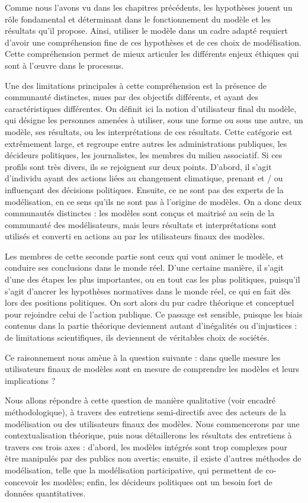 Comme nous l'avons vu dans les chapitres précédents, les hypothèses jouent un rôle fondamental et déterminant dans le fonctionnement du modèle et les résultats qu'il propose. Ainsi, utiliser le modèle dans un cadre adapté requiert d'avoir une compréhension fine de ces hypothèses et de ces choix de modélisation. Cette compréhension permet de mieux articuler les différents enjeux éthiques qui sont à l'œuvre dans le processus. 

Une des limitations principales à cette compréhension est la présence de communauté distinctes, mues par des objectifs différents, et ayant des caractéristiques différentes. On définit ici la notion d'utilisateur final du modèle, qui désigne les personnes amenées à utiliser, sous une forme ou sous une autre, un modèle, ses résultats, ou les interprétations de ces résultats. Cette catégorie est extrêmement large, et regroupe entre autres les administrations publiques, les décideurs politiques, les journalistes, les membres du milieu associatif. Si ces profils sont très divers, ils se rejoignent sur deux points. D'abord, il s'agit d'individu ayant des actions liées au changement climatique, prenant et / ou influençant des décisions politiques. Ensuite, ce ne sont pas des experts de la modélisation, en ce sens qu'ils ne sont pas à l'origine de modèles. On a donc deux communautés distinctes : les modèles sont conçus et maitrisé au sein de la communauté des modélisateurs, mais leurs résultats et interprétations sont utilisés et converti en actions au par les utilisateurs finaux des modèles. 

Les membres de cette seconde partie sont ceux qui vont animer le modèle, et conduire ses conclusions dans le monde réel. D'une certaine manière, il s'agit d'une des étapes les plus importantes, ou en tout cas les plus politiques, puisqu'il s'agit d'ancrer les hypothèses normatives dans le monde réel, ce qui en fait dès lors des positions politiques. On sort alors du pur cadre théorique et conceptuel pour rejoindre celui de l'action publique. Ce passage est sensible, puisque les biais contenus dans la partie théorique deviennent autant d'inégalités ou d'injustices : de limitations scientifiques, ils deviennent de véritables choix de sociétés.

Ce raisonnement nous amène à la question suivante : dans quelle mesure les utilisateurs finaux de modèles sont en mesure de comprendre les modèles et leurs implications ? 

Nous allons répondre à cette question de manière qualitative (voir encadré méthodologique), à travers des entretiens semi-directifs avec des acteurs de la modélisation ou des utilisateurs finaux des modèles. Nous commencerons par une contextualisation théorique, puis nous détaillerons les résultats des entretiens à travers ces trois axes : d'abord, les modèles intégrés sont trop complexes pour être manipulés par des publics non avertis; ensuite, il existe d'autres méthodes de modélisation, telle que la modélisation participative, qui permettent de co-concevoir les modèles; enfin, les décideurs politiques ont un besoin fort de données quantitatives. 




